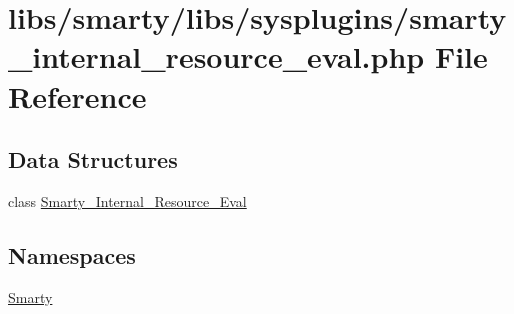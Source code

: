 \hypertarget{smarty__internal__resource__eval_8php}{}\section{libs/smarty/libs/sysplugins/smarty\+\_\+internal\+\_\+resource\+\_\+eval.php File Reference}
\label{smarty__internal__resource__eval_8php}
\subsection*{Data Structures}
\begin{DoxyCompactItemize}
\item 
class \hyperlink{class_smarty___internal___resource___eval}{Smarty\+\_\+\+Internal\+\_\+\+Resource\+\_\+\+Eval}
\end{DoxyCompactItemize}
\subsection*{Namespaces}
\begin{DoxyCompactItemize}
\item 
 \hyperlink{namespace_smarty}{Smarty}
\end{DoxyCompactItemize}
